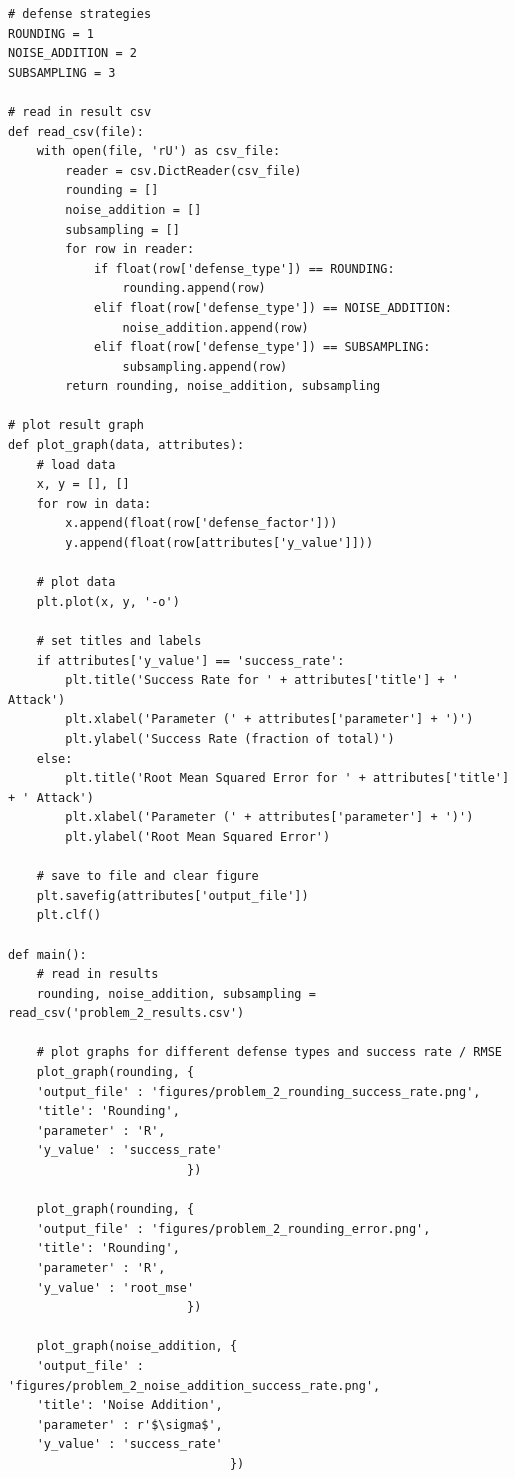 \documentclass[12pt]{article}
\begin{document}
\begin{appendices}
\begin{lstlisting}
# defense strategies
ROUNDING = 1
NOISE_ADDITION = 2
SUBSAMPLING = 3

# read in result csv
def read_csv(file):
    with open(file, 'rU') as csv_file:
        reader = csv.DictReader(csv_file)
        rounding = []
        noise_addition = []
        subsampling = []
        for row in reader:
            if float(row['defense_type']) == ROUNDING:
                rounding.append(row)
            elif float(row['defense_type']) == NOISE_ADDITION:
                noise_addition.append(row)
            elif float(row['defense_type']) == SUBSAMPLING:
                subsampling.append(row)
        return rounding, noise_addition, subsampling

# plot result graph
def plot_graph(data, attributes):
    # load data
    x, y = [], []
    for row in data:
        x.append(float(row['defense_factor']))
        y.append(float(row[attributes['y_value']]))

    # plot data
    plt.plot(x, y, '-o')

    # set titles and labels
    if attributes['y_value'] == 'success_rate':     
        plt.title('Success Rate for ' + attributes['title'] + ' Attack')
        plt.xlabel('Parameter (' + attributes['parameter'] + ')')
        plt.ylabel('Success Rate (fraction of total)')
    else:
        plt.title('Root Mean Squared Error for ' + attributes['title'] + ' Attack')
        plt.xlabel('Parameter (' + attributes['parameter'] + ')')
        plt.ylabel('Root Mean Squared Error')

    # save to file and clear figure
    plt.savefig(attributes['output_file'])
    plt.clf()

def main():
    # read in results
    rounding, noise_addition, subsampling = read_csv('problem_2_results.csv')

    # plot graphs for different defense types and success rate / RMSE
    plot_graph(rounding, {
    'output_file' : 'figures/problem_2_rounding_success_rate.png',
    'title': 'Rounding',
    'parameter' : 'R',
    'y_value' : 'success_rate'
                         })

    plot_graph(rounding, {
    'output_file' : 'figures/problem_2_rounding_error.png',
    'title': 'Rounding',
    'parameter' : 'R',
    'y_value' : 'root_mse'
                         })

    plot_graph(noise_addition, {
    'output_file' : 'figures/problem_2_noise_addition_success_rate.png',
    'title': 'Noise Addition',
    'parameter' : r'$\sigma$',
    'y_value' : 'success_rate'
                               })


\end{lstlisting}
\end{appendices}
\end{document}
